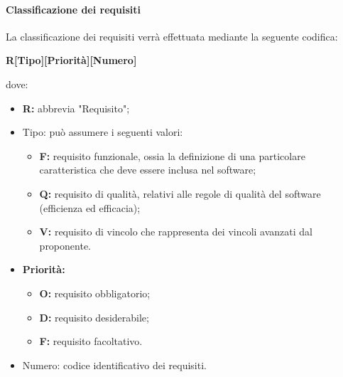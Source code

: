 \paragraph{Classificazione dei requisiti}
\label{Class_req}
La classificazione dei requisiti verrà effettuata mediante la seguente codifica:\newline
\centerline{\textbf{R[Tipo][Priorità][Numero]}}\newline
dove:
\begin{itemize}
	\item \textbf{R:} abbrevia "Requisito";
	\item Tipo: può assumere i seguenti valori:
	\begin{itemize}
		\item \textbf{F:} requisito funzionale, ossia la definizione di una particolare caratteristica che deve essere inclusa nel software;
		\item \textbf{Q:} requisito di qualità, relativi alle regole di qualità del software (efficienza ed efficacia);
		\item \textbf{V:} requisito di vincolo che rappresenta dei vincoli avanzati dal proponente.
	\end{itemize}
	\item \textbf{Priorità:}
	\begin{itemize}
		\item \textbf{O:} requisito obbligatorio;
		\item \textbf{D:} requisito desiderabile;
		\item \textbf{F:} requisito facoltativo.
	\end{itemize}
	\item Numero: codice identificativo dei requisiti.
\end{itemize}
